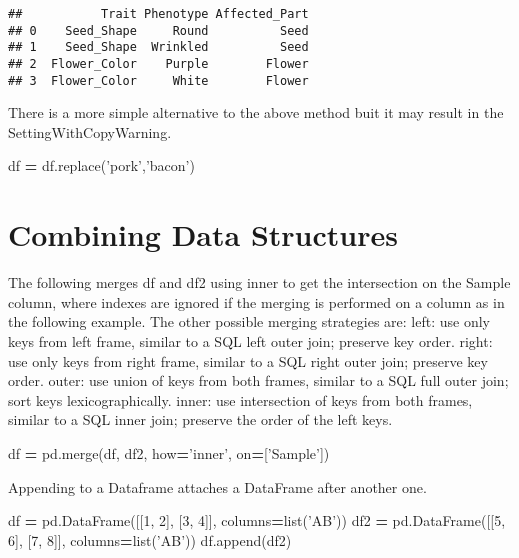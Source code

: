 \documentclass[]{book}
\newenvironment{Shaded}{\begin{snugshade}}{\end{snugshade}}
\newcommand{\BuiltInTok}[1]{#1}
\newcommand{\DecValTok}[1]{\textcolor[rgb]{0.00,0.00,0.81}{#1}}
\newcommand{\NormalTok}[1]{#1}
\newcommand{\OperatorTok}[1]{\textcolor[rgb]{0.81,0.36,0.00}{\textbf{#1}}}
\newcommand{\StringTok}[1]{\textcolor[rgb]{0.31,0.60,0.02}{#1}}
\begin{document}
\begin{verbatim}
##           Trait Phenotype Affected_Part
## 0    Seed_Shape     Round          Seed
## 1    Seed_Shape  Wrinkled          Seed
## 2  Flower_Color    Purple        Flower
## 3  Flower_Color     White        Flower
\end{verbatim}

There is a more simple alternative to the above method buit it may result in the SettingWithCopyWarning.

\begin{Shaded}
\begin{Highlighting}[]
\NormalTok{df }\OperatorTok{=}\NormalTok{ df.replace(}\StringTok{'pork'}\NormalTok{,}\StringTok{'bacon'}\NormalTok{)}
\end{Highlighting}
\end{Shaded}

\hypertarget{combining-data-structures}{%
\section{Combining Data Structures}\label{combining-data-structures}}

The following merges df and df2 using inner to get the intersection on the Sample column, where indexes are ignored if the merging is performed on a column as in the following example.
The other possible merging strategies are:
left: use only keys from left frame, similar to a SQL left outer join; preserve key order.
right: use only keys from right frame, similar to a SQL right outer join; preserve key order.
outer: use union of keys from both frames, similar to a SQL full outer join; sort keys lexicographically.
inner: use intersection of keys from both frames, similar to a SQL inner join; preserve the order of the left keys.

\begin{Shaded}
\begin{Highlighting}[]
\NormalTok{df }\OperatorTok{=}\NormalTok{ pd.merge(df, df2, how}\OperatorTok{=}\StringTok{'inner'}\NormalTok{, on}\OperatorTok{=}\NormalTok{[}\StringTok{'Sample'}\NormalTok{])}
\end{Highlighting}
\end{Shaded}

Appending to a Dataframe attaches a DataFrame after another one.

\begin{Shaded}
\begin{Highlighting}[]
\NormalTok{df }\OperatorTok{=}\NormalTok{ pd.DataFrame([[}\DecValTok{1}\NormalTok{, }\DecValTok{2}\NormalTok{], [}\DecValTok{3}\NormalTok{, }\DecValTok{4}\NormalTok{]], columns}\OperatorTok{=}\BuiltInTok{list}\NormalTok{(}\StringTok{'AB'}\NormalTok{))}
\NormalTok{df2 }\OperatorTok{=}\NormalTok{ pd.DataFrame([[}\DecValTok{5}\NormalTok{, }\DecValTok{6}\NormalTok{], [}\DecValTok{7}\NormalTok{, }\DecValTok{8}\NormalTok{]], columns}\OperatorTok{=}\BuiltInTok{list}\NormalTok{(}\StringTok{'AB'}\NormalTok{))}
\NormalTok{df.append(df2)}
\end{Highlighting}
\end{Shaded}
\end{document}
